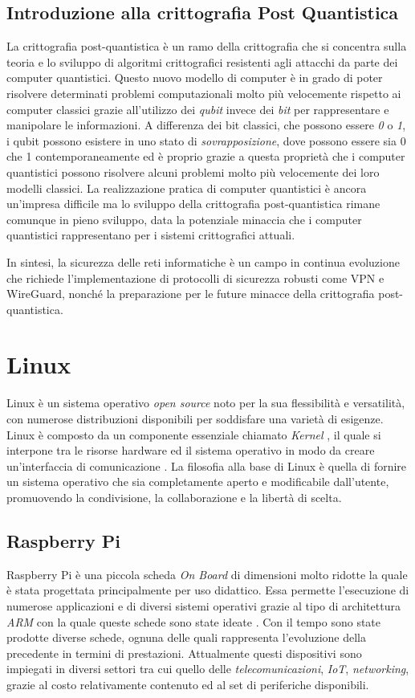 \subsection{Introduzione alla crittografia Post Quantistica}
La crittografia post-quantistica \cite{crittografia} è un ramo della crittografia che si concentra sulla teoria e lo sviluppo di algoritmi crittografici resistenti agli attacchi da parte dei computer quantistici. Questo nuovo modello di computer è in grado di poter risolvere determinati problemi computazionali molto più velocemente rispetto ai computer classici grazie all'utilizzo dei \emph{qubit} invece dei \emph{bit} per rappresentare e manipolare le informazioni. A differenza dei bit classici, che possono essere \emph{0} o \emph{1}, i qubit possono esistere in uno stato di \emph{sovrapposizione}, dove possono essere sia 0 che 1 contemporaneamente ed è proprio grazie a questa proprietà che i computer quantistici possono risolvere alcuni problemi molto più velocemente dei loro modelli classici.
La realizzazione pratica di computer quantistici è ancora un’impresa difficile ma lo sviluppo della crittografia post-quantistica rimane comunque in pieno sviluppo, data la potenziale minaccia che i computer quantistici rappresentano per i sistemi crittografici attuali.

In sintesi, la sicurezza delle reti informatiche è un campo in continua evoluzione che richiede l’implementazione di protocolli di sicurezza robusti come VPN e WireGuard, nonché la preparazione per le future minacce della crittografia post-quantistica.

\section{Linux}
Linux è un sistema operativo \emph{open source} noto per la sua flessibilità e versatilità, con numerose distribuzioni disponibili per soddisfare una varietà di esigenze. Linux è composto da un componente essenziale chiamato \emph{Kernel} \cite{kernel}, il quale si interpone tra le risorse hardware ed il sistema operativo in modo da creare un'interfaccia di comunicazione . La filosofia alla base di Linux è quella di fornire un sistema operativo che sia completamente aperto e modificabile dall’utente, promuovendo la condivisione, la collaborazione e la libertà di scelta.

\subsection{Raspberry Pi}
Raspberry Pi è una piccola scheda \emph{On Board} di dimensioni molto ridotte la quale è stata progettata principalmente per uso didattico. Essa permette l'esecuzione di numerose applicazioni e di diversi sistemi operativi grazie al tipo di architettura \emph{ARM} con la quale queste schede sono state ideate \cite{arm}. Con il tempo sono state prodotte diverse schede, ognuna delle quali rappresenta l'evoluzione della precedente in termini di prestazioni. Attualmente questi dispositivi sono impiegati in diversi settori tra cui quello delle \emph{telecomunicazioni}, \emph{IoT}, \emph{networking}, grazie al costo relativamente contenuto ed al set di periferiche disponibili.

